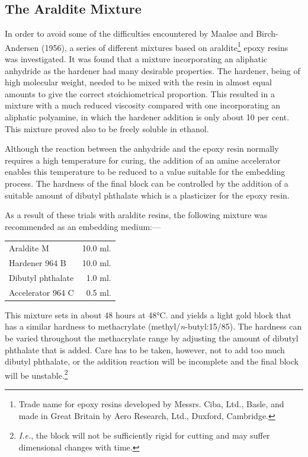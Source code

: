 \documentclass{article}
\begin{document}
\subsection*{The Araldite Mixture}

In order to avoid some of the difficulties encountered by Maaløe and Birch-Andersen (1956), a series of different mixtures based on araldite\footnote{Trade name for epoxy resins developed by Messrs. Ciba, Ltd., Basle, and made in Great Britain by Aero Research, Ltd., Duxford, Cambridge.} epoxy resins was investigated. It was found that a mixture incorporating an aliphatic anhydride as the hardener had many desirable properties. The hardener, being of high molecular weight, needed to be mixed with the resin in almost equal amounts to give the correct stoichiometrical proportion. This resulted in a mixture with a much reduced viscosity compared with one incorporating an aliphatic polyamine, in which the hardener addition is only about 10 per cent. This mixture proved also to be freely soluble in ethanol.

Although the reaction between the anhydride and the epoxy resin normally requires a high temperature for curing, the addition of an amine accelerator enables this temperature to be reduced to a value suitable for the embedding process. The hardness of the final block can be controlled by the addition of a suitable amount of dibutyl phthalate which is a plasticizer for the epoxy resin.

As a result of these trials with araldite resins, the following mixture was recommended as an embedding medium:—

\begin{center}
\begin{tabular}{@{}lr@{}}
Araldite M & 10.0 ml.\\
Hardener 964 B & 10.0 ml.\\
Dibutyl phthalate & 1.0 ml.\\
Accelerator 964 C & 0.5 ml.\\
\end{tabular}
\end{center}

This mixture sets in about 48 hours at 48°C. and yields a light gold block that has a similar hardness to methacrylate (methyl/\textit{n}-butyl:15/85). The hardness can be varied throughout the methacrylate range by adjusting the amount of dibutyl phthalate that is added. Care has to be taken, however, not to add too much dibutyl phthalate, or the addition reaction will be incomplete and the final block will be unstable.\footnote{\textit{I.e.}, the block will not be sufficiently rigid for cutting and may suffer dimensional changes with time.}
\end{document}
